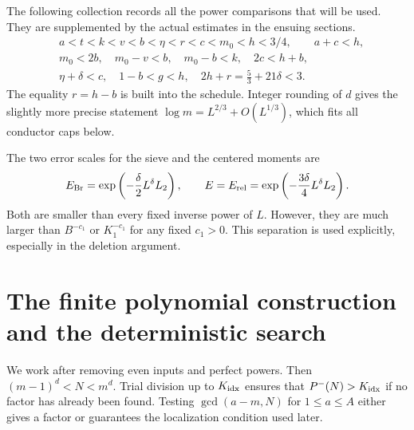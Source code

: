 The following collection records all the power comparisons that will
be used.  They are supplemented by the actual estimates in the ensuing
sections.
\begin{align}
 &a<t<k<v<b<\eta<r<c<m_0<h<3/4,
       \qquad a+c<h,\label{eq:gates1}\\
 &m_0<2b,\quad m_0-v<b,\quad m_0-b<k,
       \quad 2c<h+b,\label{eq:gates2}\\
 &\eta+\delta<c,\quad 1-b<g<h,
       \quad 2h+r=\frac53+21\delta<3.\label{eq:gates3}
\end{align}
The equality \(r=h-b\) is built into the schedule.  Integer rounding of
\(d\) gives the slightly more precise statement
\(\log m=L^{2/3}+O(L^{1/3})\), which fits all conductor caps below.

The two error scales for the sieve and the centered moments are
\begin{equation}\label{eq:errors}
 E_{\rm Br}=\exp\left(-\frac\delta2L^\delta L_2\right),
 \qquad E=E_{\rm rel}
 =\exp\left(-\frac{3\delta}4L^\delta L_2\right).
\end{equation}
Both are smaller than every fixed inverse power of \(L\).  However,
they are much larger than \(B^{-c_1}\) or \(K_1^{-c_1}\) for any fixed
\(c_1>0\).  This separation is used explicitly, especially in the
deletion argument.

\section{The finite polynomial construction and the deterministic search}
\label{sec:construction}

We work after removing even inputs and perfect powers.  Then
\((m-1)^d<N<m^d\).  Trial division up to \(K_{\rm idx}\) ensures that
\(P^-(N)>K_{\rm idx}\) if no factor has already been found.  Testing
\(\gcd(a-m,N)\) for \(1\le a\le A\) either gives a factor or guarantees
the localization condition used later.

